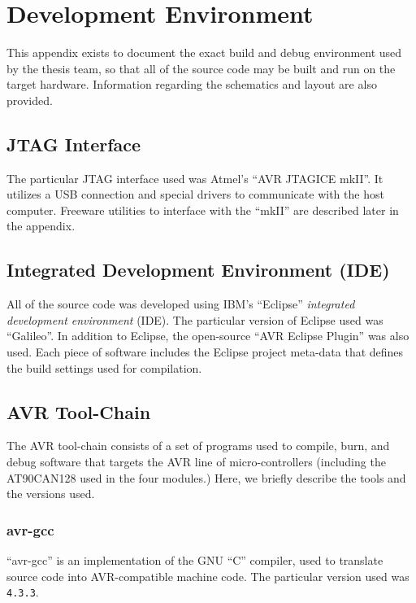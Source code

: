 \chapter{Development Environment}
\label{apx:environment}

This appendix exists to document the exact build and debug environment used by the thesis team, so that all of the source code may be built  and run on the target hardware. Information regarding the schematics and layout are also provided.

\section*{JTAG Interface}

The particular JTAG interface used was Atmel's ``AVR JTAGICE mkII''. It utilizes a USB connection and special drivers to communicate with the host computer. Freeware utilities to interface with the ``mkII'' are described later in the appendix.

\section*{Integrated Development Environment (IDE)}

All of the source code was developed using IBM's ``Eclipse'' \emph{integrated development environment} (IDE). The particular version of Eclipse used was {}``Galileo''. In addition to Eclipse, the open-source {}``AVR Eclipse Plugin'' was also used. Each piece of software includes the Eclipse project meta-data that defines the build settings used for compilation.

\section*{AVR Tool-Chain}

The AVR tool-chain consists of a set of programs used to compile, burn, and debug software that targets the AVR line of micro-controllers (including the AT90CAN128 used in the four modules.) Here, we briefly describe the tools and the versions used.

\subsection*{avr-gcc}

{}``avr-gcc'' is an implementation of the GNU ``C'' compiler, used to translate source code into AVR-compatible machine code. The particular version used was \texttt{4.3.3}.

